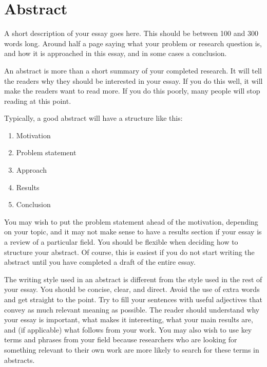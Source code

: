 \chapter*{Abstract} 

A short description of your essay goes here. This should be between 100 and 300 words long. Around half a page saying what your problem or research question is, and how it is approached in this essay, and in some cases a conclusion. 

An abstract is more than a short summary of your completed research. It will tell the readers why they should be interested in your essay. If you do this well, it will make the readers want to read more. If you do this poorly, many people will stop reading at this point.

Typically, a good abstract will have a structure like this:

\begin{enumerate}
\item Motivation
\item Problem statement
\item Approach
\item Results
\item Conclusion
\end{enumerate}

You may wish to put the problem statement ahead of the motivation, depending on your topic, and it may not make sense to have a results section if your essay is a review of a particular field. You should be flexible when deciding how to structure your abstract. Of course, this is easiest if you do not start writing the abstract until you have completed a draft of the entire essay.

The writing style used in an abstract is different from the style used in the rest of your essay. You should be concise, clear, and direct. Avoid the use of extra words and get straight to the point. Try to fill your sentences with useful adjectives that convey as much relevant meaning as possible. The reader should understand why your essay is important, what makes it interesting, what your main results are, and (if applicable) what follows from your work. You may also wish to use key terms and phrases from your field because researchers who are looking for something relevant to their own work are more likely to search for these terms in abstracts.

